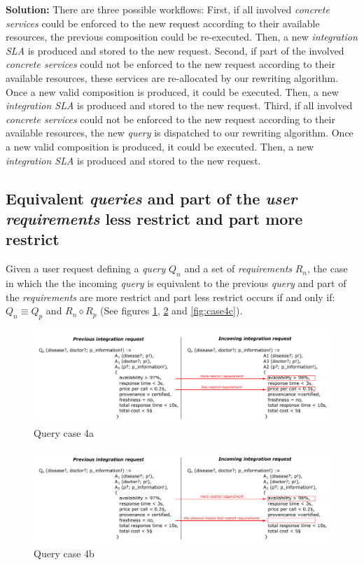 \bigskip
\noindent \textbf{Solution:}  There are three possible workflows: First, if all involved \textsl{concrete services} could be enforced to the new request according to their available resources, the previous composition could be re-executed. Then, a new \textsl{integration SLA} is produced and stored to the new request. Second, if part of the involved \textsl{concrete services} could not be enforced to the new request according to their available resources, these services are re-allocated by our rewriting algorithm. Once a new valid composition is produced, it could be executed. Then, a new \textsl{integration SLA} is produced and stored to the new request. Third, if all involved \textsl{concrete services} could not be enforced to the new request according to their available resources, the new \textsl{query} is dispatched to our rewriting algorithm. Once a new valid composition is produced, it  could be executed. Then, a new \textsl{integration SLA} is produced and stored to the new request.

\subsection{Equivalent \textsl{queries} and part of the \textsl{user requirements} less restrict and part more restrict}
Given a user request defining a \textsl{query} $Q_{n}$ and a set of \textsl{requirements} $R_{n}$, the case in which the the incoming \textsl{query} is equivalent to the previous \textsl{query} and part of the \textsl{requirements} are more restrict and part less restrict occurs if and only if: $Q_{n} \equiv Q_{p}$ and $R_{n} \diamond R_{p}$ (See figures \ref{fig:case4a}, \ref{fig:case4b} and \ref{fig:case4c}).

\begin{figure}[h!]
\center
\includegraphics[scale=0.85]{figures/query-case-4a.pdf}\caption{Query case 4a} \label{fig:case4a}
\end{figure}

\begin{figure}[h!]
\center
\includegraphics[scale=0.85]{figures/query-case-4b.pdf}\caption{Query case 4b} \label{fig:case4b}
\end{figure}

